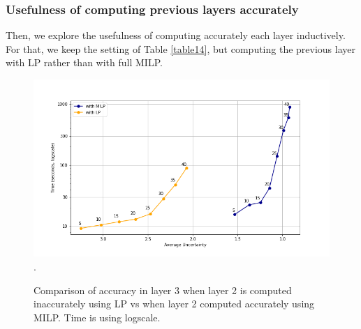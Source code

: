 %
%
%



\subsubsection*{Usefulness of computing previous layers accurately}	


Then, we explore the usefulness of computing accurately each layer inductively.
For that, we keep the setting of  Table \ref{table14}, but computing the previous layer with LP rather than with full MILP.


\begin{figure}[h!]
	\hspace*{-0.8cm}
	\includegraphics[scale=0.6]{Layer3_comparison_LP}.
	\caption{Comparison of accuracy in layer 3 when layer 2 is computed inaccurately using LP vs when layer 2 computed accurately using MILP.
	Time is using logscale.}
	\label{fig3LP}
\end{figure}








